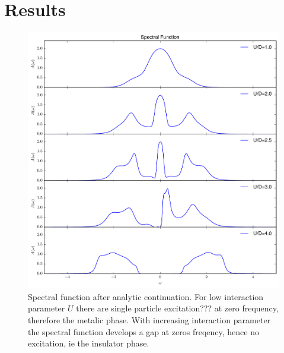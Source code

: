 \section{Results}
\begin{figure}[t]
	\centering
	\includegraphics[width=\textwidth]{Mott_transition}
	\caption{Spectral function after analytic continuation. For low interaction parameter $U$ there are single particle excitation??? at zero frequency, therefore the metalic phase. With increasing interaction parameter the spectral function develops a gap at zeros freqency, hence no excitation, ie the insulator phase.}
	\label{fig:spectralf}
\end{figure}
\clearpage
